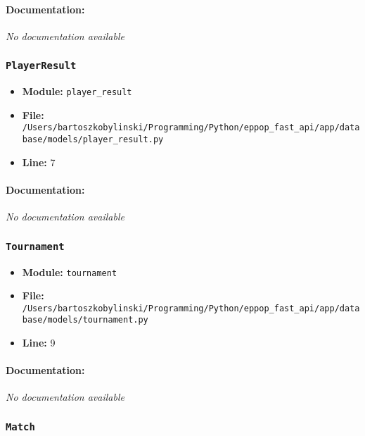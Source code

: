 \documentclass[11pt,a4paper]{article}
\begin{document}
\paragraph{Documentation:} \textit{No documentation available}


\vspace{1em}
\subsubsection{\texttt{PlayerResult}}

\begin{itemize}
    \item \textbf{Module:} \texttt{player\_result}
    \item \textbf{File:} \texttt{/Users/bartoszkobylinski/Programming/Python/eppop\_fast\_api/app/database/models/player\_result.py}
    \item \textbf{Line:} 7
\end{itemize}

\paragraph{Documentation:} \textit{No documentation available}


\vspace{1em}
\subsubsection{\texttt{Tournament}}

\begin{itemize}
    \item \textbf{Module:} \texttt{tournament}
    \item \textbf{File:} \texttt{/Users/bartoszkobylinski/Programming/Python/eppop\_fast\_api/app/database/models/tournament.py}
    \item \textbf{Line:} 9
\end{itemize}

\paragraph{Documentation:} \textit{No documentation available}


\vspace{1em}
\subsubsection{\texttt{Match}}
\end{document}
